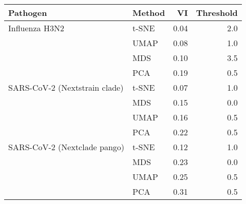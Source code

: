 \begin{tabular}{llrr}
\toprule
                     Pathogen & Method &   VI &  Threshold \\
\midrule
               Influenza H3N2 &  t-SNE & 0.04 &        2.0 \\
                              &   UMAP & 0.08 &        1.0 \\
                              &    MDS & 0.10 &        3.5 \\
                              &    PCA & 0.19 &        0.5 \\
SARS-CoV-2 (Nextstrain clade) &  t-SNE & 0.07 &        1.0 \\
                              &    MDS & 0.15 &        0.0 \\
                              &   UMAP & 0.16 &        0.5 \\
                              &    PCA & 0.22 &        0.5 \\
 SARS-CoV-2 (Nextclade pango) &  t-SNE & 0.12 &        1.0 \\
                              &    MDS & 0.23 &        0.0 \\
                              &   UMAP & 0.25 &        0.5 \\
                              &    PCA & 0.31 &        0.5 \\
\bottomrule
\end{tabular}
